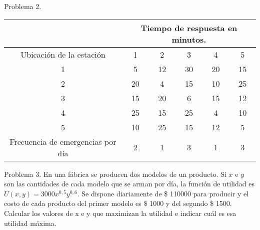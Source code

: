 \documentclass{beamer}
\begin{document}
\begin{frame}[fragile]{Problema 2.}
  \begin{center}
    \begin{adjustbox}{width = 0.95 \textwidth}
        \begin{tabular}{|c |c |c|c|c|c|}
          \hline
          & \multicolumn{5}{|c|}{Tiempo de respuesta en minutos.} \\ 
          \hline
          Ubicación de la estación & 1 & 2 & 3 & 4 & 5 \\
          \hline
          1 & 5 & 12 & 30 & 20 & 15 \\ 
          2 & 20 & 4 & 15 & 10 & 25 \\
          3 & 15 & 20 & 6 & 15 & 12 \\
          4 & 25 & 15 & 25 & 4 & 10 \\
          5 & 10 & 25 & 15 & 12 & 5 \\
          \hline
          Frecuencia de emergencias por día & 2  & 1  & 3 & 1 & 3 \\
          \hline 
        \end{tabular}
    \end{adjustbox}
  \end{center}
\end{frame}

\begin{frame}[fragile]{Problema 3.}
En una fábrica se producen dos modelos de un producto. 
Si $x$ e $y$ son las cantidades de
cada modelo que se arman por día, la función de utilidad es $U (x, y) = 3000x^{0,5}y^{0,6}$. 
Se
dispone diariamente de \$ 110000 para producir y el costo de cada producto del primer
modelo es \$ 1000 y del segundo \$ 1500. 
Calcular los valores de x e y que maximizan la
utilidad e indicar cuál es esa utilidad máxima.
\end{frame}
\end{document}
